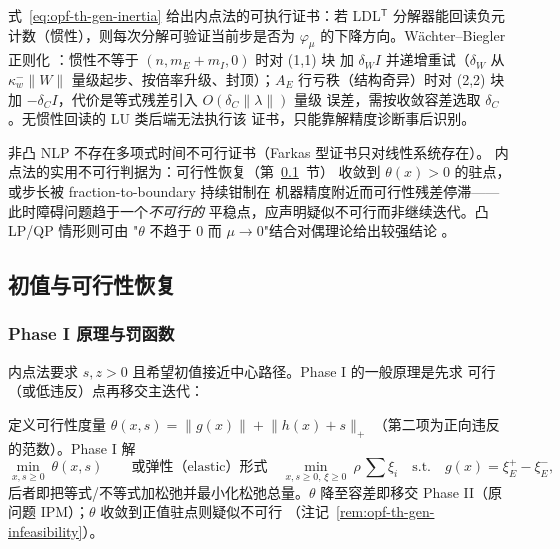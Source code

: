 \begin{remark}\label{rem:opf-th-gen-regularization}
式~\eqref{eq:opf-th-gen-inertia} 给出内点法的可执行证书：若 LDL$^{\mathsf T}$
分解器能回读负元计数（惯性），则每次分解可验证当前步是否为
$\varphi_\mu$ 的下降方向。W\"achter--Biegler 正则化
\cite{opft:waechter-biegler}：惯性不等于 $(n,m_E+m_I,0)$ 时对 (1,1) 块
加 $\delta_W I$ 并递增重试（$\delta_W$ 从 $\kappa_w^- \lVert W\rVert$
量级起步、按倍率升级、封顶）；$A_E$ 行亏秩（结构奇异）时对 (2,2) 块加
$-\delta_C I$，代价是等式残差引入 $O(\delta_C\lVert\lambda\rVert)$ 量级
误差，需按收敛容差选取 $\delta_C$。无惯性回读的 LU 类后端无法执行该
证书，只能靠解精度诊断事后识别。
\end{remark}

\begin{remark}[不可行检测]\label{rem:opf-th-gen-infeasibility}
非凸 NLP 不存在多项式时间不可行证书（Farkas 型证书只对线性系统存在）。
内点法的实用不可行判据为：可行性恢复（第~\ref{sec:opf-th-gen-phase1}~节）
收敛到 $\theta(x)>0$ 的驻点，或步长被 fraction-to-boundary 持续钳制在
机器精度附近而可行性残差停滞——此时障碍问题趋于一个\emph{不可行的}
平稳点，应声明疑似不可行而非继续迭代。凸 LP/QP 情形则可由
"$\theta$ 不趋于 $0$ 而 $\mu\to0$"结合对偶理论给出较强结论
\cite{opft:wright-ipm}。
\end{remark}

\subsection{初值与可行性恢复}\label{sec:opf-th-gen-phase1}

\subsubsection{Phase I 原理与罚函数}

内点法要求 $s,z>0$ 且希望初值接近中心路径。Phase I 的一般原理是先求
可行（或低违反）点再移交主迭代：

\begin{definition}\label{def:opf-th-gen-phase1}
定义可行性度量
$\theta(x,s)=\lVert g(x)\rVert+\lVert h(x)+s\rVert_+$
（第二项为正向违反的范数）。Phase I 解
\begin{equation}
\min_{x,s\ge0}\ \theta(x,s)
\qquad\text{或弹性（elastic）形式}\quad
\min_{x,s\ge0,\,\xi\ge0}\ \rho\,\textstyle\sum\xi_i
\quad\text{s.t.}\quad g(x)=\xi_E^+-\xi_E^- ,
\label{eq:opf-th-gen-phase1}
\end{equation}
后者即把等式/不等式加松弛并最小化松弛总量。$\theta$ 降至容差即移交
Phase II（原问题 IPM）；$\theta$ 收敛到正值驻点则疑似不可行
（注记~\ref{rem:opf-th-gen-infeasibility}）。
\end{definition}


